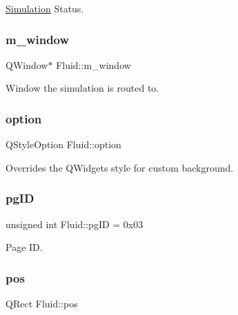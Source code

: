\mbox{\hyperlink{classSimulation}{Simulation}} Status. 

\mbox{\label{classFluid_a138f09aa54f3209e67bf3e0a847bcdbc}} 
\subsubsection{\texorpdfstring{m\_window}{m\_window}}
{\footnotesize\ttfamily Q\+Window$\ast$ Fluid\+::m\+\_\+window\hspace{0.3cm}{\ttfamily [private]}}



Window the simulation is routed to. 

\mbox{\label{classFluid_afcdad9ca2270eca892ebe19cc6eb0792}} 
\subsubsection{\texorpdfstring{option}{option}}
{\footnotesize\ttfamily Q\+Style\+Option Fluid\+::option\hspace{0.3cm}{\ttfamily [private]}}



Overrides the Q\+Widget\textquotesingle{}s style for custom background. 

\mbox{\label{classFluid_a6a918fd3756b078ac094010cf5215f90}} 
\subsubsection{\texorpdfstring{pgID}{pgID}}
{\footnotesize\ttfamily unsigned int Fluid\+::pg\+ID = 0x03}



Page ID. 

\mbox{\label{classFluid_acc8b08224f3d6ee3a6d662c27562e1ab}} 
\subsubsection{\texorpdfstring{pos}{pos}}
{\footnotesize\ttfamily Q\+Rect Fluid\+::pos\hspace{0.3cm}{\ttfamily [private]}}



